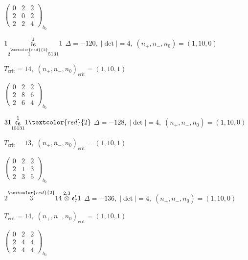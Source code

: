\documentclass[10pt]{article}
\begin{document}
\hspace{2em}$\left(\begin{smallmatrix}0 & 2 & 2 \\ 2 & 0 & 2 \\ 2 & 2 & 4\end{smallmatrix}\right)_{\!b_0}$

\smallskip

$1\overset{1}{\underset{2\overset{\textcolor{red}{2}}{1}5131}{\mathfrak{e}_6}}1$ \quad $\Delta=-120,\; |\det|=4,\; (n_+,n_-,n_0)=(1,10,0)$

\hspace{1em}$T_{\text{crit}}=14,\; (n_+,n_-,n_0)_{\text{crit}}=(1,10,1)$

\hspace{2em}$\left(\begin{smallmatrix}0 & 2 & 2 \\ 2 & 8 & 6 \\ 2 & 6 & 4\end{smallmatrix}\right)_{\!b_0}$

\smallskip

$31\overset{1}{\underset{15131}{\mathfrak{e}_6}}1\textcolor{red}{2}$ \quad $\Delta=-128,\; |\det|=4,\; (n_+,n_-,n_0)=(1,10,0)$

\hspace{1em}$T_{\text{crit}}=13,\; (n_+,n_-,n_0)_{\text{crit}}=(1,10,1)$

\hspace{2em}$\left(\begin{smallmatrix}0 & 2 & 2 \\ 2 & 1 & 3 \\ 2 & 3 & 5\end{smallmatrix}\right)_{\!b_0}$

\smallskip

$2\overset{\textcolor{red}{2}}{3}14\overset{2,3}{\otimes}\mathfrak{e}_7'1$ \quad $\Delta=-136,\; |\det|=4,\; (n_+,n_-,n_0)=(1,10,0)$

\hspace{1em}$T_{\text{crit}}=14,\; (n_+,n_-,n_0)_{\text{crit}}=(1,10,1)$

\hspace{2em}$\left(\begin{smallmatrix}0 & 2 & 2 \\ 2 & 4 & 4 \\ 2 & 4 & 4\end{smallmatrix}\right)_{\!b_0}$
\end{document}
